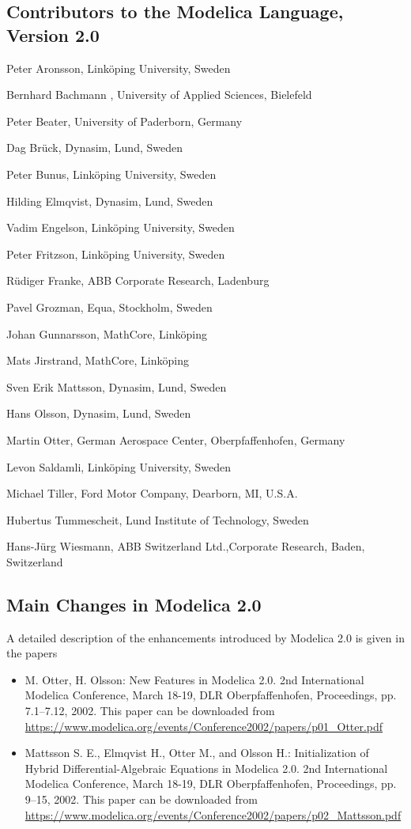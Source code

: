 \subsection{Contributors to the Modelica Language, Version 2.0}\label{contributors-to-the-modelica-language-version-2-0}
\indent\indent
Peter Aronsson, Linköping University, Sweden

Bernhard Bachmann , University of Applied Sciences, Bielefeld

Peter Beater, University of Paderborn, Germany

Dag Brück, Dynasim, Lund, Sweden

Peter Bunus, Linköping University, Sweden

Hilding Elmqvist, Dynasim, Lund, Sweden

Vadim Engelson, Linköping University, Sweden

Peter Fritzson, Linköping University, Sweden

Rüdiger Franke, ABB Corporate Research, Ladenburg

Pavel Grozman, Equa, Stockholm, Sweden

Johan Gunnarsson, MathCore, Linköping

Mats Jirstrand, MathCore, Linköping

Sven Erik Mattsson, Dynasim, Lund, Sweden

Hans Olsson, Dynasim, Lund, Sweden

Martin Otter, German Aerospace Center, Oberpfaffenhofen, Germany

Levon Saldamli, Linköping University, Sweden

Michael Tiller, Ford Motor Company, Dearborn, MI, U.S.A.

Hubertus Tummescheit, Lund Institute of Technology, Sweden

Hans-Jürg Wiesmann, ABB Switzerland Ltd.,Corporate Research, Baden,
Switzerland

\subsection{Main Changes in Modelica 2.0}\label{main-changes-in-modelica-2-0}

A detailed description of the enhancements introduced by Modelica 2.0 is
given in the papers
\begin{itemize}
\item
  M. Otter, H. Olsson: New Features in Modelica 2.0. 2nd International
  Modelica Conference, March 18-19, DLR Oberpfaffenhofen, Proceedings,
  pp. 7.1--7.12, 2002. This paper can be downloaded from
  \url{https://www.modelica.org/events/Conference2002/papers/p01_Otter.pdf}
\item
  Mattsson S. E., Elmqvist H., Otter M., and Olsson H.: Initialization
  of Hybrid Differential-Algebraic Equations in Modelica 2.0. 2nd
  International Modelica Conference, March 18-19, DLR Oberpfaffenhofen,
  Proceedings, pp. 9--15, 2002. This paper can be downloaded from
  \url{https://www.modelica.org/events/Conference2002/papers/p02_Mattsson.pdf}
\end{itemize}

